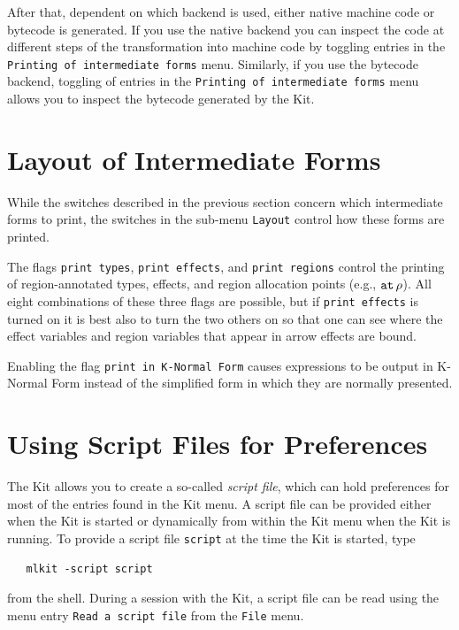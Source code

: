 \documentclass[12pt]{book}
\begin{document}
After that, dependent on which backend is used, either 
%
native machine code or bytecode is generated. If you use the native
backend you can inspect the code at different steps of the
transformation into machine code by toggling entries in the
\texttt{Printing of intermediate forms} menu. Similarly, if you use
the
%
bytecode backend, toggling of entries in the \texttt{Printing of
  intermediate forms} menu allows you to inspect the bytecode
generated by the Kit.

\section{Layout of Intermediate Forms}
\label{layout_intermediate_forms.sec}
While the switches described in the previous section concern which
intermediate forms to print, the switches in the sub-menu
\texttt{Layout} control how these forms
are printed.

The flags 
%
\texttt{print types},
%
\texttt{print effects}, and
%
\texttt{print regions} control the printing of region-annotated types,
effects, and region allocation points (e.g., $\mathbin{\hbox{\tt at}}\,\rho$).
All eight combinations of these three flags are possible, but if
%
{\tt print effects} is turned on it is best also to turn the two
others on so that one can see where the effect variables and region variables
that appear in arrow effects are bound.

Enabling the flag
%
\texttt{print in K-Normal Form}
%
causes expressions to be output in K-Normal Form instead of the
simplified form in which they are normally presented.

\section{Using Script Files for Preferences}
\label{scriptfiles.sec}
The Kit allows you to create a so-called 
%
{\em script file}, which can hold preferences for most of the entries
found in the Kit menu. A script file can be provided either when the
Kit is started or dynamically from within the Kit menu when the Kit is
running. To provide a script file {\tt script} at the time the Kit is
started, type
\begin{verbatim}
   mlkit -script script
\end{verbatim}
from the shell. During a session with the Kit, a script file can be
read using the menu entry {\tt Read a script file} from the {\tt File}
menu.
\end{document}
